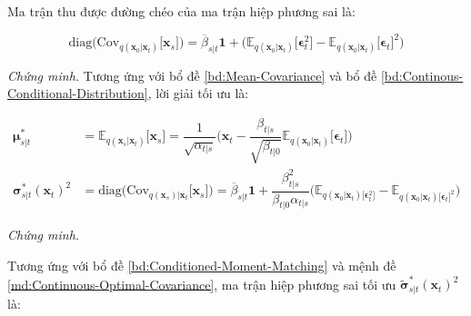 \documentclass[14pt, a4paper]{article}
\numberwithin{equation}{section}
\numberwithin{figure}{section}
\numberwithin{dl}{section}
\numberwithin{md}{section}
\numberwithin{bd}{section}
\numberwithin{dn}{section}
\numberwithin{hq}{section}
\begin{document}
    Ma trận thu được đường chéo của ma trận hiệp phương sai là:

    \begin{equation}
        \mathrm{diag}\big( \mathrm{Cov}_{q(\boldsymbol{x}_0 \vert \boldsymbol{x}_t)} \lbrack \boldsymbol{x}_s \rbrack \big) = \overline{\beta}_{s \vert t} \boldsymbol{1} + \big( \mathbb{E}_{q(\boldsymbol{x}_0 \vert \boldsymbol{x}_t)} \lbrack \boldsymbol{\epsilon}_t^2 \rbrack - \mathbb{E}_{q(\boldsymbol{x}_0 \vert \boldsymbol{x}_t)} \lbrack \boldsymbol{\epsilon}_t \rbrack^2 \big)
    \end{equation}

    \continuousoptimalcovariance*

    \textit{Chứng minh.}
    Tương ứng với bổ đề \ref{bd:Mean-Covariance} và bổ đề \ref{bd:Continous-Conditional-Distribution}, lời giải tối ưu là:

    \begin{equation}
        \begin{aligned}
            \boldsymbol{\mu}_{s \vert t}^{\ast} &= \mathbb{E}_{q(\boldsymbol{x}_s \vert \boldsymbol{x}_t)} \lbrack \boldsymbol{x}_s \rbrack = \dfrac{1}{\sqrt{\alpha_{t \vert s}}} \big( \boldsymbol{x}_t - \dfrac{\beta_{t \vert s}}{\sqrt{\beta_{t \vert 0}}} \mathbb{E}_{q(\boldsymbol{x}_0 \vert \boldsymbol{x}_t)} \lbrack \boldsymbol{\epsilon}_t \rbrack \big) \\
            \boldsymbol{\sigma}_{s \vert t}^{\ast} (\boldsymbol{x}_t)^2 &= \mathrm{diag} \big( \mathrm{Cov}_{q(\boldsymbol{x}_s) \vert \boldsymbol{x}_t} \lbrack \boldsymbol{x}_s \rbrack \big) = \overline{\beta}_{s \vert t} \boldsymbol{1} + \dfrac{\beta_{t \vert s}^2}{\beta_{t \vert 0} \alpha_{t \vert s}} \big( \mathbb{E}_{q(\boldsymbol{x}_0 \vert \boldsymbol{x}_t) \lbrack \boldsymbol{\epsilon}_t^2 \rbrack} - \mathbb{E}_{q(\boldsymbol{x}_0 \vert \boldsymbol{x}_t) \lbrack \boldsymbol{\epsilon}_t \rbrack^2} \big)
        \end{aligned}
    \end{equation}

    \continuouscorrectedoptimalcovariance*

    \textit{Chứng minh.}

    Tương ứng với bổ đề \ref{bd:Conditioned-Moment-Matching} và mệnh đề \ref{md:Continuous-Optimal-Covariance}, ma trận hiệp phương sai tối ưu $\tilde{\boldsymbol{\sigma}}_{s \vert t}^{\ast} (\boldsymbol{x}_t)^2$ là:
\end{document}
